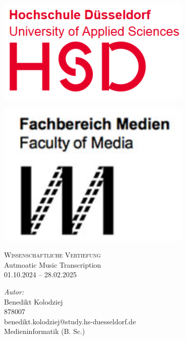 \begin{titlepage}
    \thispagestyle{empty}

    \vspace*{1cm} %
    \begin{minipage}{0.45\textwidth}
        \raggedright
        \includegraphics[width=0.7\textwidth]{Graphics/HSDLogo} %
    \end{minipage}%
    \hfill
    \begin{minipage}{0.45\textwidth}
        \raggedleft
        \includegraphics[width=0.7\textwidth]{Graphics/FacultyOfMedia} %
    \end{minipage}

    \vspace{1.5cm} %

    \center

    \textsc{\large Wissenschaftliche Vertiefung}\\
    \vspace{0.5cm}
    \Large{Autmoatic Music Transcription}\\
    \small{01.10.2024 – 28.02.2025}
    \vspace{2cm}

    \begin{center}
        \textit{Autor:} \\
        Benedikt Kolodziej \\
        878007 \\
        benedikt.kolodziej@study.hs-duesseldorf.de   \\
        Medieninformatik (B. Sc.) \\[1cm]


\end{center}
\end{titlepage}
